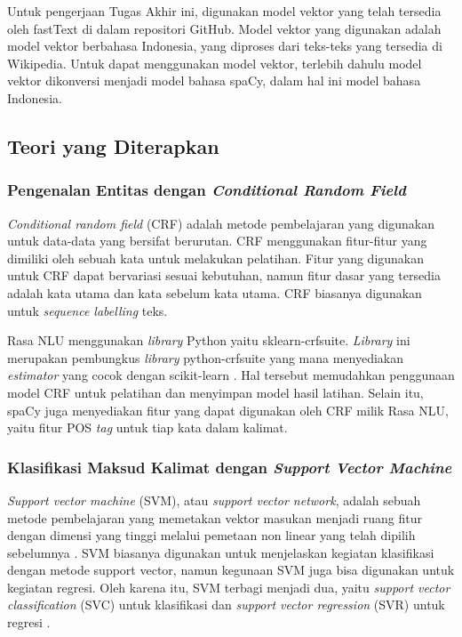 Untuk pengerjaan Tugas Akhir ini, digunakan model vektor yang telah tersedia oleh fastText di dalam repositori GitHub. Model vektor yang digunakan adalah model vektor berbahasa Indonesia, yang diproses dari teks-teks yang tersedia di Wikipedia. Untuk dapat menggunakan model vektor, terlebih dahulu model vektor dikonversi menjadi model bahasa spaCy, dalam hal ini model bahasa Indonesia.

\subsection{Teori yang Diterapkan}

\subsubsection{Pengenalan Entitas dengan \textit{Conditional Random Field}}

\textit{Conditional random field} (CRF) adalah metode pembelajaran yang digunakan untuk data-data yang bersifat berurutan. CRF menggunakan fitur-fitur yang dimiliki oleh sebuah kata untuk melakukan pelatihan. Fitur yang digunakan untuk CRF dapat bervariasi sesuai kebutuhan, namun fitur dasar yang tersedia adalah kata utama dan kata sebelum kata utama. CRF biasanya digunakan untuk \textit{sequence labelling} teks.

Rasa NLU menggunakan \textit{library} Python yaitu sklearn-crfsuite. \textit{Library} ini merupakan pembungkus \textit{library} python-crfsuite yang mana menyediakan \textit{estimator} yang cocok dengan scikit-learn \parencite{sklearncrf}. Hal tersebut memudahkan penggunaan model CRF untuk pelatihan dan menyimpan model hasil latihan. Selain itu, spaCy juga menyediakan fitur yang dapat digunakan oleh CRF milik Rasa NLU, yaitu fitur POS \textit{tag} untuk tiap kata dalam kalimat.

\subsubsection{Klasifikasi Maksud Kalimat dengan \textit{Support Vector Machine}}

\textit{Support vector machine} (SVM), atau \textit{support vector network}, adalah sebuah metode pembelajaran yang memetakan vektor masukan menjadi ruang fitur dengan dimensi yang tinggi melalui pemetaan non linear yang telah dipilih sebelumnya \parencite{cortes1995support}. SVM biasanya digunakan untuk menjelaskan kegiatan klasifikasi dengan metode support vector, namun kegunaan SVM juga bisa digunakan untuk kegiatan regresi. Oleh karena itu, SVM terbagi menjadi dua, yaitu \textit{support vector classification} (SVC) untuk klasifikasi dan \textit{support vector regression} (SVR) untuk regresi \parencite{gunn1998support}.

